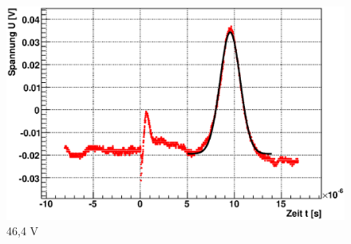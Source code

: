 \documentclass[12pt]{article}
\begin{document}
\begin{figure}[H]
\begin{minipage}{0.33\linewidth}
\centering 
\includegraphics[width=0.9\linewidth]{pictures/varVolt/02.eps}
\small{46,4 V}
\end{minipage}
\end{figure}
\end{document}
